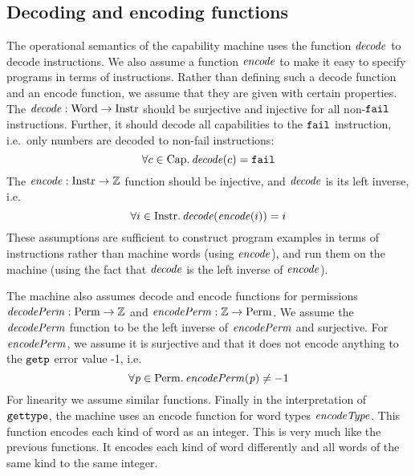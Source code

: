 \documentclass{jfp}
\renewcommand{\decInstr}[1]{\plainfun{decode}{#1}}
\renewcommand{\encInstr}[1]{\plainfun{encode}{#1}}
\renewcommand{\perm}{\var{p}}
\newenvironment{jversion}{}{}
\begin{document}
\begin{jversion}
\subsection{Decoding and encoding functions}
The operational semantics of the capability machine uses the function $\decInstr{}$ to decode instructions.
We also assume a function $\encInstr{}$ to make it easy to specify programs in terms of instructions.
Rather than defining such a decode function and an encode function, we assume that they are given with certain properties.
The $\decInstr{} : \Word \fun \Instr$ should be surjective and injective for all non-$\texttt{{\color{black} fail}}$ instructions.
Further, it should decode all capabilities to the $\texttt{{\color{black} fail}}$ instruction, i.e.\ only numbers are decoded to non-fail instructions:
\[
\forall c \in \Caps \ldotp \decInstr{c} = \fail
\]
The $\encInstr{} : \Instr \fun \ints$ function should be injective, and  $\decInstr{}$ is its left inverse, i.e.
\[
\forall i \in \Instr \ldotp \decInstr{}(\encInstr{i}) = i
\]
These assumptions are sufficient to construct program examples in terms of instructions rather than machine words (using $\encInstr{}$), and run them on the machine (using the fact that $\decInstr{}$ is the left inverse of $\encInstr{}$).

The machine also assumes decode and encode functions for permissions $\decPerm{} : \Perm \fun \ints$ and $\encPerm{} : \ints \fun \Perm$.
We assume the $\decPerm{}$ function to be the left inverse of $\encPerm{}$ and surjective. For $\encPerm{}$, we assume it is surjective and that it does not encode anything to the $\tgetp{}{}$ error value -1, i.e.
\[
  \forall \perm \in \Perm \ldotp \encPerm{\perm} \neq -1
\]
For linearity we assume similar functions.
Finally in the interpretation of $\tisptr{}{}$, the machine uses an encode function for word types $\encType{}$.
This function encodes each kind of word as an integer.
This is very much like the previous functions.
It encodes each kind of word differently and all words of the same kind to the same integer.
\end{jversion}
\end{document}
